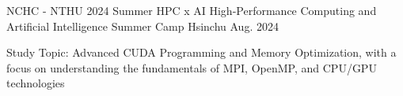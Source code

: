 \begin{cventries}
\cventry
{NCHC - NTHU} %
{2024 Summer HPC x AI High-Performance Computing and Artificial Intelligence Summer Camp} %
{Hsinchu} %
{Aug. 2024} %
{
  \begin{cvitems} %
    \item {Study Topic: Advanced CUDA Programming and Memory Optimization, with a focus on understanding the fundamentals of MPI, OpenMP, and CPU/GPU technologies}
  \end{cvitems}
}

\end{cventries}
